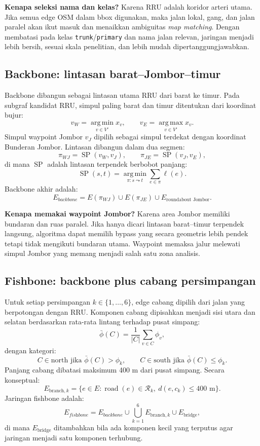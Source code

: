 \documentclass[11pt,a4paper]{article}
\newcommand{\fishbone}{\textit{fishbone}}
\newcommand{\backbone}{\textit{backbone}}
\newcommand{\argmin}{\operatorname*{arg\,min}}
\newcommand{\argmax}{\operatorname*{arg\,max}}
\begin{document}
\textbf{Kenapa seleksi nama dan kelas?} Karena RRU adalah koridor arteri utama. Jika semua edge OSM dalam bbox digunakan, maka jalan lokal, gang, dan jalan paralel akan ikut masuk dan menaikkan ambiguitas \textit{map matching}. Dengan membatasi pada kelas \texttt{trunk}/\texttt{primary} dan nama jalan relevan, jaringan menjadi lebih bersih, sesuai skala penelitian, dan lebih mudah dipertanggungjawabkan.

\subsection{Backbone: lintasan barat--Jombor--timur}
Backbone dibangun sebagai lintasan utama RRU dari barat ke timur. Pada subgraf kandidat RRU, simpul paling barat dan timur ditentukan dari koordinat bujur:
\[
v_W=\argmin_{v\in V'} x_v,\qquad v_E=\argmax_{v\in V'} x_v.
\]
Simpul waypoint Jombor $v_J$ dipilih sebagai simpul terdekat dengan koordinat Bunderan Jombor. Lintasan dibangun dalam dua segmen:
\[
\pi_{WJ}=\operatorname{SP}(v_W,v_J),\qquad
\pi_{JE}=\operatorname{SP}(v_J,v_E),
\]
di mana $\operatorname{SP}$ adalah lintasan terpendek berbobot panjang:
\[
\operatorname{SP}(s,t)=\argmin_{\pi:s\leadsto t}\sum_{e\in\pi}\ell(e).
\]
Backbone akhir adalah:
\[
E_{\backbone}=E(\pi_{WJ})\cup E(\pi_{JE})\cup E_{\text{roundabout Jombor}}.
\]

\textbf{Kenapa memakai waypoint Jombor?} Karena area Jombor memiliki bundaran dan ruas paralel. Jika hanya dicari lintasan barat--timur terpendek langsung, algoritma dapat memilih bypass yang secara geometris lebih pendek tetapi tidak mengikuti bundaran utama. Waypoint memaksa jalur melewati simpul Jombor yang memang menjadi salah satu zona analisis.

\subsection{Fishbone: backbone plus cabang persimpangan}
Untuk setiap persimpangan $k\in\{1,\ldots,6\}$, edge cabang dipilih dari jalan yang berpotongan dengan RRU. Komponen cabang dipisahkan menjadi sisi utara dan selatan berdasarkan rata-rata lintang terhadap pusat simpang:
\[
\bar{\phi}(C)=\frac{1}{|C|}\sum_{v\in C}\phi_v,
\]
dengan kategori:
\[
C\in\text{north jika }\bar{\phi}(C)>\phi_k,
\qquad
C\in\text{south jika }\bar{\phi}(C)\leq\phi_k.
\]
Panjang cabang dibatasi maksimum 400 m dari pusat simpang. Secara konseptual:
\[
E_{\text{branch},k}=\{e\in E: \operatorname{road}(e)\in \mathcal{R}_k,\ d(e,c_k)\leq 400\text{ m}\}.
\]
Jaringan fishbone adalah:
\[
E_{\fishbone}=E_{\backbone}\cup\bigcup_{k=1}^{6}E_{\text{branch},k}\cup E_{\text{bridge}},
\]
di mana $E_{\text{bridge}}$ ditambahkan bila ada komponen kecil yang terputus agar jaringan menjadi satu komponen terhubung.
\end{document}

